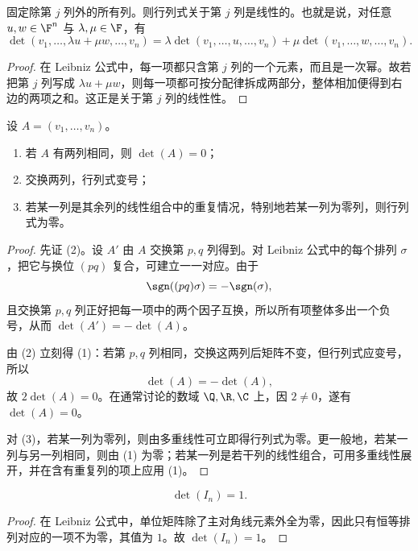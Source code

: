 \begin{proposition}[多重线性]
固定除第 $j$ 列外的所有列。则行列式关于第 $j$ 列是线性的。也就是说，对任意 $u,w\in\F^n$ 与 $\lambda,\mu\in\F$，有
\[
\det(v_1,\dots,\lambda u+\mu w,\dots,v_n)
=\lambda\det(v_1,\dots,u,\dots,v_n)+\mu\det(v_1,\dots,w,\dots,v_n).
\]
\end{proposition}

\begin{proof}
在 Leibniz 公式中，每一项都只含第 $j$ 列的一个元素，而且是一次幂。故若把第 $j$ 列写成 $\lambda u+\mu w$，则每一项都可按分配律拆成两部分，整体相加便得到右边的两项之和。这正是关于第 $j$ 列的线性性。
\end{proof}

\begin{proposition}[交错性]
设 $A=(v_1,\dots,v_n)$。
\begin{enumerate}[label=(\arabic*)]
  \item 若 $A$ 有两列相同，则 $\det(A)=0$；
  \item 交换两列，行列式变号；
  \item 若某一列是其余列的线性组合中的重复情况，特别地若某一列为零列，则行列式为零。
\end{enumerate}
\end{proposition}

\begin{proof}
先证 (2)。设 $A'$ 由 $A$ 交换第 $p,q$ 列得到。对 Leibniz 公式中的每个排列 $\sigma$，把它与换位 $(pq)$ 复合，可建立一一对应。由于
\[
\sgn((pq)\sigma)=-\sgn(\sigma),
\]
且交换第 $p,q$ 列正好把每一项中的两个因子互换，所以所有项整体多出一个负号，从而 $\det(A')=-\det(A)$。

由 (2) 立刻得 (1)：若第 $p,q$ 列相同，交换这两列后矩阵不变，但行列式应变号，所以
\[
\det(A)=-\det(A),
\]
故 $2\det(A)=0$。在通常讨论的数域 $\Q,\R,\C$ 上，因 $2\ne0$，遂有 $\det(A)=0$。

对 (3)，若某一列为零列，则由多重线性可立即得行列式为零。更一般地，若某一列与另一列相同，则由 (1) 为零；若某一列是若干列的线性组合，可用多重线性展开，并在含有重复列的项上应用 (1)。
\end{proof}

\begin{proposition}[标准化]
\[
\det(I_n)=1.
\]
\end{proposition}

\begin{proof}
在 Leibniz 公式中，单位矩阵除了主对角线元素外全为零，因此只有恒等排列对应的一项不为零，其值为 $1$。故 $\det(I_n)=1$。
\end{proof}

